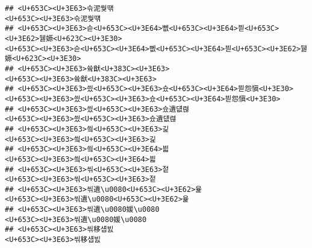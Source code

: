 \documentclass[]{article}
\begin{document}
\begin{verbatim}
## <U+653C><U+3E63>슦泥쒖떆                                                                                                                                                                                         <U+653C><U+3E63>슦泥쒖떆
## <U+653C><U+3E63>슫<U+653C><U+3E64>뻾<U+653C><U+3E64>븯<U+653C><U+3E62>뒗嫄<U+623C><U+3E30>                                                                                                     <U+653C><U+3E63>슫<U+653C><U+3E64>뻾<U+653C><U+3E64>븯<U+653C><U+3E62>뒗嫄<U+623C><U+3E30>
## <U+653C><U+3E63>쓬猷<U+383C><U+3E63>                                                                                                                                                                             <U+653C><U+3E63>쓬猷<U+383C><U+3E63>
## <U+653C><U+3E63>씠<U+653C><U+3E63>슜<U+653C><U+3E64>븯怨愼<U+3E30>                                                                                                                                   <U+653C><U+3E63>씠<U+653C><U+3E63>슜<U+653C><U+3E64>븯怨愼<U+3E30>
## <U+653C><U+3E63>씠<U+653C><U+3E63>슜遺덊렪                                                                                                                                                                 <U+653C><U+3E63>씠<U+653C><U+3E63>슜遺덊렪
## <U+653C><U+3E63>씤<U+653C><U+3E63>긽                                                                                                                                                                             <U+653C><U+3E63>씤<U+653C><U+3E63>긽
## <U+653C><U+3E63>씤<U+653C><U+3E64>븳                                                                                                                                                                             <U+653C><U+3E63>씤<U+653C><U+3E64>븳
## <U+653C><U+3E63>씪<U+653C><U+3E63>젙                                                                                                                                                                             <U+653C><U+3E63>씪<U+653C><U+3E63>젙
## <U+653C><U+3E63>씪遺\u0080<U+653C><U+3E62>윭                                                                                                                                                             <U+653C><U+3E63>씪遺\u0080<U+653C><U+3E62>윭
## <U+653C><U+3E63>씪遺\u0080媛\u0080                                                                                                                                                                     <U+653C><U+3E63>씪遺\u0080媛\u0080
## <U+653C><U+3E63>씪移섑빐                                                                                                                                                                                         <U+653C><U+3E63>씪移섑빐

\end{verbatim}
\end{document}
